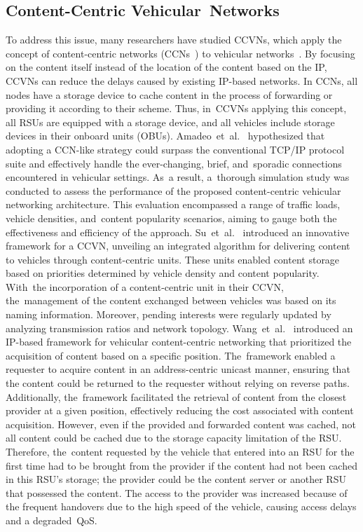 \documentclass[sensors,aricle,accept,pdftex,moreauthors]{Definitions/mdpi}
\begin{document}
\subsection{Content-Centric Vehicular~Networks}
To address this issue,  many researchers have studied {CCVNs}, which apply the concept of content-centric networks (CCNs~\cite{Jacobson2009, zhang2014}) to vehicular networks~\cite{Amadeo2012, Su2017, Wang2019}.
By focusing on the content itself instead of the location of the content based on the IP, CCVNs can reduce the delays caused by existing IP-based networks.
In CCNs, all nodes have a storage device to cache content in the process of forwarding or providing it according to their scheme.
Thus, in~CCVNs applying this concept, all RSUs are equipped with a storage device, and all vehicles include storage devices in their onboard units (OBUs).
Amadeo~et~al.~\cite{Amadeo2012} hypothesized that adopting a CCN-like strategy could surpass the conventional TCP/IP protocol suite and effectively handle the ever-changing, brief, and~sporadic connections encountered in vehicular settings. As~a result, a~thorough simulation study was conducted to assess the performance of the proposed content-centric vehicular networking architecture. This evaluation encompassed a range of traffic loads, vehicle densities, and~content popularity scenarios, aiming to gauge both the effectiveness and efficiency of the approach.
Su~et~al.~\cite{Su2017} introduced an innovative framework for a {CCVN}, unveiling an integrated algorithm for delivering content to vehicles through content-centric units. These units enabled content storage based on priorities determined by vehicle density and content popularity. With~the incorporation of a content-centric unit in their CCVN, the~management of the content exchanged between vehicles was based on its naming information. Moreover, pending interests were regularly updated by analyzing transmission ratios and network topology.
Wang~et~al.~\cite{Wang2019} introduced an IP-based framework for vehicular content-centric networking that prioritized the acquisition of content based on a specific position. The~framework enabled a requester to acquire content in {an address-centric unicast manner}, ensuring that the content could be returned to the requester without relying on reverse paths. Additionally, the~framework facilitated the retrieval of content from the closest provider at a given position, effectively reducing the cost associated with content acquisition.
However, even if the provided and forwarded content was cached, not all content could be cached due to the storage capacity limitation of the RSU.
Therefore, the~content requested by the vehicle that entered into an RSU for the first time 
had to be brought from the provider if the content had not been cached in this RSU's storage; the provider could be the content server or another RSU that possessed the content.
The access to the provider was increased because of the frequent handovers due to the high speed of the vehicle, causing access delays and a degraded~QoS.
\end{document}
